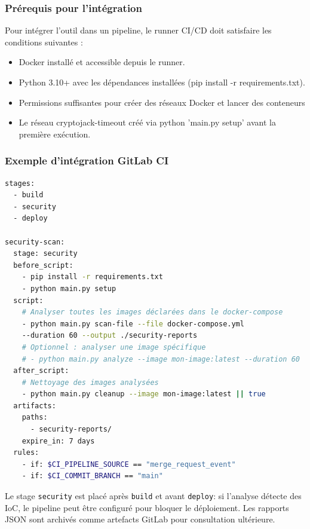 \subsubsection{Prérequis pour l'intégration}
Pour intégrer l'outil dans un pipeline, le runner CI/CD doit satisfaire les conditions suivantes :
\begin{itemize}
    \item Docker installé et accessible depuis le runner.
    \item Python 3.10+ avec les dépendances installées (pip install -r requirements.txt).
    \item Permissions suffisantes pour créer des réseaux Docker et lancer des conteneurs
    \item Le réseau cryptojack-timeout créé via python 'main.py setup' avant la première exécution.
\end{itemize}

\subsubsection{Exemple d'intégration GitLab CI}
\begin{lstlisting}[language=bash, caption=Exemple intégration gitlab CI]
stages:
  - build
  - security
  - deploy

security-scan:
  stage: security
  before_script:
    - pip install -r requirements.txt
    - python main.py setup
  script:
    # Analyser toutes les images déclarées dans le docker-compose
    - python main.py scan-file --file docker-compose.yml 
    --duration 60 --output ./security-reports
    # Optionnel : analyser une image spécifique
    # - python main.py analyze --image mon-image:latest --duration 60
  after_script:
    # Nettoyage des images analysées
    - python main.py cleanup --image mon-image:latest || true
  artifacts:
    paths:
      - security-reports/
    expire_in: 7 days
  rules:
    - if: $CI_PIPELINE_SOURCE == "merge_request_event"
    - if: $CI_COMMIT_BRANCH == "main"
\end{lstlisting}

Le stage \texttt{security} est placé après \texttt{build} et avant \texttt{deploy}: si l'analyse détecte des IoC, le pipeline peut être configuré pour bloquer le déploiement. Les rapports JSON sont archivés comme artefacts GitLab pour consultation ultérieure.

